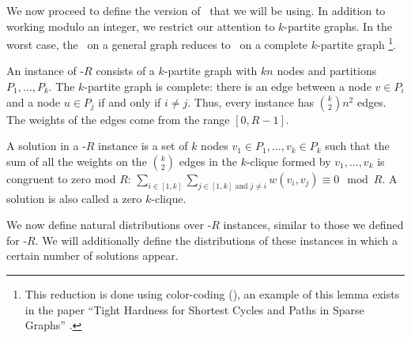 %

We now proceed to define the version of \zkclique~that we will be using. In addition to working modulo an integer, we restrict our attention to $k$-partite graphs. In the worst case, the \zkclique~on a general graph reduces to \zkclique~on a complete $k$-partite graph \footnote{This reduction is done using color-coding (\cite{colorcoding}), an example of this lemma exists in the paper ``Tight Hardness for Shortest Cycles and Paths in Sparse Graphs'' \cite{sparseGraphsLVWW}.}\cite{colorcoding}. 


\begin{definition}
An instance of \zkclique-$R$ consists of a $k$-partite graph with $kn$ nodes and 
partitions $P_1, \ldots, P_k$. The $k$-partite graph is complete: there is an edge between a node  $v\in P_i$ and a node $u \in P_j$ if and only if $i \ne j$. Thus, every instance has $\binom k 2 n^2$ edges. The weights of the edges come from the range $[0,R-1]$.

	
	A solution in a \zkclique-$R$ instance is a set of $k$ nodes $v_1 \in P_1, \ldots, v_k \in P_k$ such that the sum of all the weights on the $\binom{k}{2}$ edges in the $k$-clique formed by $v_1,\ldots,v_k$ is congruent to zero mod $R$: $\sum_{i \in [1,k]}\sum_{j \in [1,k] \text{ and } j\ne i} w(v_i,v_j) \equiv 0 \mod R$. A solution is also called a  zero $k$-clique. 
\end{definition}

We now define natural distributions over \zkclique-$R$ instances, similar to those we defined for \kSum-$R$.
We will additionally define the distributions of these instances in which a certain number of solutions appear. 

